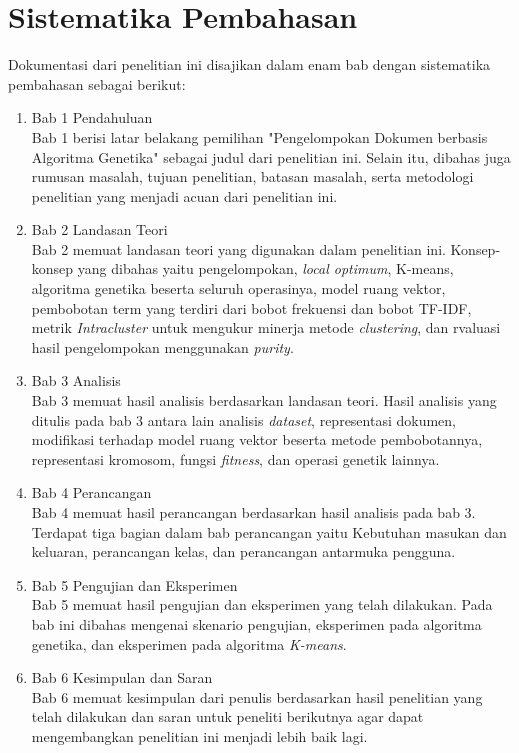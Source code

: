 \section{Sistematika Pembahasan}
\label{sec:sispem}
Dokumentasi dari penelitian ini disajikan dalam enam bab dengan sistematika pembahasan sebagai berikut:
\begin{enumerate}
	\item Bab 1 Pendahuluan\\
		Bab 1 berisi latar belakang pemilihan "Pengelompokan Dokumen berbasis Algoritma Genetika" sebagai judul dari penelitian ini. Selain itu, dibahas juga rumusan masalah, tujuan penelitian, batasan masalah, serta metodologi penelitian yang menjadi acuan dari penelitian ini.
	\item Bab 2 Landasan Teori\\
		Bab 2 memuat landasan teori yang digunakan dalam penelitian ini. Konsep-konsep yang dibahas yaitu pengelompokan, \textit{local optimum}, K-means, algoritma genetika beserta seluruh operasinya, model ruang vektor, pembobotan term yang terdiri dari bobot frekuensi dan bobot TF-IDF, metrik \textit{Intracluster} untuk mengukur minerja metode \textit{clustering}, dan rvaluasi hasil pengelompokan menggunakan \textit{purity}.
	\item Bab 3 Analisis\\		
		Bab 3 memuat hasil analisis berdasarkan landasan teori. Hasil analisis yang ditulis pada bab 3 antara lain analisis \textit{dataset}, representasi dokumen, modifikasi terhadap model ruang vektor beserta metode pembobotannya, representasi kromosom, fungsi \textit{fitness}, dan operasi genetik lainnya.
	\item Bab 4 Perancangan\\
		Bab 4 memuat hasil perancangan berdasarkan hasil analisis pada bab 3. Terdapat tiga bagian dalam bab perancangan yaitu Kebutuhan masukan dan keluaran, perancangan kelas, dan perancangan antarmuka pengguna.
	\item Bab 5 Pengujian dan Eksperimen\\
		Bab 5 memuat hasil pengujian dan eksperimen yang telah dilakukan. Pada bab ini dibahas mengenai skenario pengujian, eksperimen pada algoritma genetika, dan eksperimen pada algoritma \textit{K-means}.
	\item Bab 6 Kesimpulan dan Saran\\
		Bab 6 memuat kesimpulan dari penulis berdasarkan hasil penelitian yang telah dilakukan dan saran untuk peneliti berikutnya agar dapat mengembangkan penelitian ini menjadi lebih baik lagi.
\end{enumerate}
